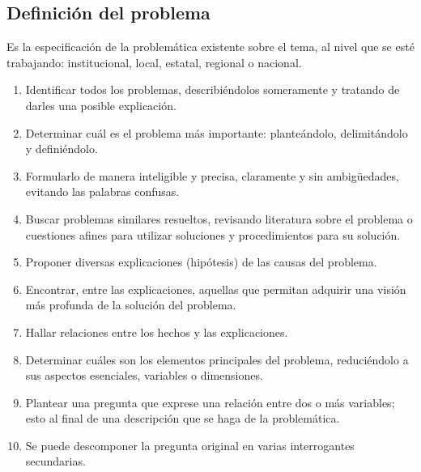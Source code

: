 \subsection{Definición del problema}

Es la especificación de la problemática existente sobre el tema, al nivel que se esté trabajando: institucional, local, estatal, regional o nacional.

\begin{enumerate}[noitemsep]
 \item Identificar todos los problemas, describiéndolos someramente y tratando de darles una posible explicación.
 \item Determinar cuál es el problema más importante: planteándolo, delimitándolo y definiéndolo.
 \item Formularlo de manera inteligible y precisa, claramente y sin ambigüedades, evitando las palabras confusas.
 \item Buscar problemas similares resueltos, revisando literatura sobre el problema o cuestiones afines para utilizar soluciones y procedimientos para su solución.
 \item Proponer diversas explicaciones (hipótesis) de las causas del problema.
 \item Encontrar, entre las explicaciones, aquellas que permitan adquirir una visión más profunda de la solución del problema.
 \item Hallar relaciones entre los hechos y las explicaciones.
 \item Determinar cuáles son los elementos principales del problema, reduciéndolo a sus aspectos esenciales, variables o dimensiones.
 \item Plantear una pregunta que exprese una relación entre dos o más variables; esto al final de una descripción que se haga de la problemática.
 \item Se puede descomponer la pregunta original en varias interrogantes secundarias.
\end{enumerate}
